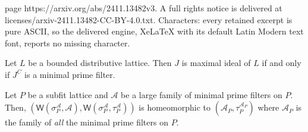 \documentclass[10pt,a4paper]{amsart}
\newcommand{\aaa}{\mathcal{A} }
\newcommand{\spa}{\sigma^\aaa_P}
\newcommand{\wall}[2]{\mathsf{W}(#1,#2)}
\begin{document}
page https://arxiv.org/abs/2411.13482v3. A full rights notice is delivered at licenses/arxiv-2411.13482-CC-BY-4.0.txt. Characters: every retained excerpt is pure ASCII, so the delivered engine, XeLaTeX with its default Latin Modern text font, reports no missing character.
\begin{corollary}
\label{cor:idealsandfilters}
    Let $L$ be a  bounded distributive lattice. Then  $J$ is maximal ideal of $L$ if and only if $J^C$ is a minimal prime filter.
\end{corollary}

\begin{theorem}
\label{thm:wallmancompactification-lattice}
Let $P$ be a subfit lattice and $\aaa$ be a large  family of minimal prime filters on $P$. Then, $(\wall{\spa}{\aaa},\wall{\spa}{\tau^\aaa_P} )$ is homeomorphic to $(\aaa_P, \tau^{\aaa_P}_P)$ where $\aaa_P$ is the family of \emph{all} the minimal prime filters on $P$.
\end{theorem}
\end{document}
